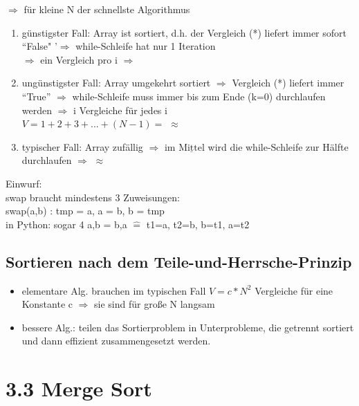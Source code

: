 \documentclass[11pt, fleqn]{scrreprt}
\begin{document}
    $\Rightarrow$ für kleine N der schnellste Algorithmus \\
    \vspace*{-5mm}
    \begin{enumerate}
        \item günstigster Fall: Array ist sortiert, d.h. der Vergleich (*) liefert immer sofort ``False" '$\Rightarrow$ while-Schleife hat nur 1 Iteration \\
        $\Rightarrow$ ein Vergleich pro i $\Rightarrow$
        \item ungünstigster Fall: Array umgekehrt sortiert $\Rightarrow$ Vergleich (*) liefert immer ``True'' $\Rightarrow$ while-Schleife muss immer bis zum Ende (k=0) durchlaufen werden $\Rightarrow$ i Vergleiche für jedes i \\
        $V=1+2+3+...+(N-1)=$  $\approx$ 
        \item typischer Fall: Array zufällig $\Rightarrow$ im $\underline{\text{Mittel}}$ wird die while-Schleife zur Hälfte durchlaufen $\Rightarrow$  $\approx$ 
    \end{enumerate}


    Einwurf: \\
    swap braucht mindestens 3 Zuweisungen: \\
    \hspace*{5mm} swap(a,b) : tmp = a, a = b, b = tmp \\
    in Python: sogar 4 a,b = b,a $\widehat{=}$ t1=a, t2=b, b=t1, a=t2


    \subsection*{Sortieren nach dem Teile-und-Herrsche-Prinzip}

    \begin{itemize}
        \item elementare Alg. brauchen im typischen Fall $V= c * N^2$ Vergleiche für eine Konstante c $\Rightarrow$ sie sind für große N langsam
        \item bessere Alg.: teilen das Sortierproblem in Unterprobleme, die getrennt sortiert und dann effizient zusammengesetzt werden.

    \end{itemize}

    \section*{3.3 Merge Sort}
\end{document}
